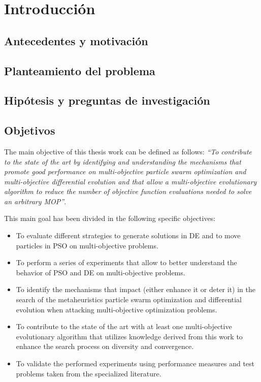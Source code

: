 \chapter{Introducción}

\lipsum[2-4]

\section{Antecedentes y motivación} 


\lipsum[2-4]

\section{Planteamiento del problema} 

\lipsum[2-4]

\section{Hipótesis y preguntas de investigación}

\lipsum[1]

\section{Objetivos}

The main objective of this thesis work can be defined as follows: \emph{``To contribute to the state of the art by identifying and understanding the mechanisms that promote good performance on multi-objective particle swarm optimization and multi-objective differential evolution and that allow a multi-objective evolutionary algorithm to reduce the number of objective function evaluations needed to solve an arbitrary MOP''}. 

This main goal has been divided in the following specific objectives: 
\begin{itemize}\setlength{\itemsep}{-1mm}
	\item To evaluate different strategies to generate solutions in DE and to move particles in PSO on multi-objective problems.
	\item To perform a series of experiments that allow to better understand the behavior of PSO and DE on multi-objective problems.
	\item To identify the mechanisms that impact (either enhance it or deter it) in the search of the metaheuristics particle swarm optimization and differential evolution when attacking multi-objective optimization problems. 
	\item To contribute to the state of the art with at least one multi-objective evolutionary algorithm that utilizes knowledge derived from this work to enhance the search process on diversity and convergence. 
	\item To validate the performed experiments using performance measures and test problems taken from the specialized literature.
\end{itemize}


